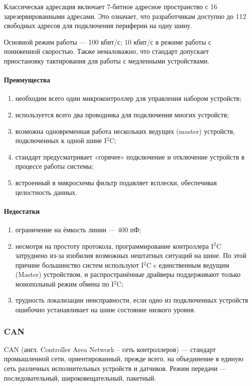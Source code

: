 \documentclass[a4paper,14pt]{extarticle}
\begin{document}
Классическая адресация включает 7-битное адресное пространство с 16 зарезервированными адресами. Это означает, что разработчикам доступно до 112 свободных адресов для подключения периферии на одну шину.

Основной режим работы — 100 кбит/с; 10 кбит/с в режиме работы с пониженной скоростью. Также немаловажно, что стандарт допускает приостановку тактирования для работы с медленными устройствами.

\paragraph*{Преимущества}
\begin{enumerate}
	\item необходим всего один микроконтроллер для управления набором устройств;
	\item используется всего два проводника для подключения многих устройств;
	\item возможна одновременная работа нескольких ведущих (master) устройств, подключенных к одной шине I${}^2$C;
	\item стандарт предусматривает «горячее» подключение и отключение устройств в процессе работы системы;
	\item встроенный в микросхемы фильтр подавляет всплески, обеспечивая целостность данных.
\end{enumerate}

\paragraph*{Недостатки}
\begin{enumerate}
	\item ограничение на ёмкость линии — 400 пФ;
	\item несмотря на простоту протокола, программирование контроллера I${}^2$C затруднено из-за изобилия возможных нештатных ситуаций на шине. По этой причине большинство систем используют I${}^2$C c единственным ведущим (Master) устройством, и распространённые драйверы поддерживают только монопольный режим обмена по I${}^2$C;
	\item трудность локализации неисправности, если одно из подключенных устройств ошибочно устанавливает на шине состояние низкого уровня.
\end{enumerate}
\subsubsection*{CAN}
CAN (англ. Controller Area Network -- сеть контроллеров) --- стандарт промышленной сети, ориентированный, прежде всего, на объединение в единую сеть различных исполнительных устройств и датчиков. Режим передачи — последовательный, широковещательный, пакетный.
\end{document}
